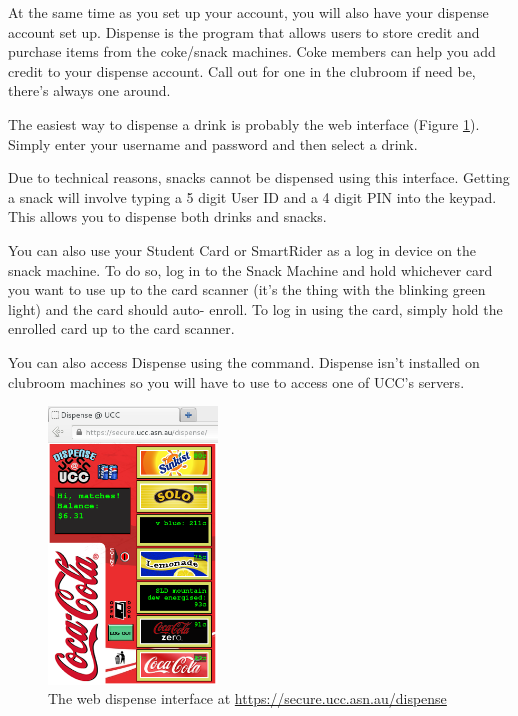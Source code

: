 

\begin{mdframed}

At the same time as you set up your account, you will also have your dispense account set up. Dispense is the program that allows users to store credit and purchase items from the coke/snack machines. Coke members can help you add credit to your dispense account. Call out for one in the clubroom if need be, there's always one around.


The easiest way to dispense a drink is probably the web interface (Figure \ref{webdispense.png}). Simply enter your username and password and then select a drink. 

Due to technical reasons, snacks cannot be dispensed using this interface. Getting a snack will involve typing a 5 digit User ID and a 4 digit PIN into the keypad. This allows you to dispense both drinks and snacks.

You can also use your Student Card or SmartRider as a log in device on the snack machine. To do so, log in to the Snack Machine and hold whichever card you want to use up to the card scanner (it's the thing with the blinking green light) and the card should auto- enroll. To log in using the card, simply hold the enrolled card up to the card scanner.


You can also access Dispense using the  command. Dispense isn't installed on clubroom machines so you will have to use  to access one of UCC's servers.


\begin{figure}[H]
	\centering
	\includegraphics[width=0.4\textwidth]{figures/webdispense.png}
	\caption{The web dispense interface at \url{https://secure.ucc.asn.au/dispense}} 
	\label{webdispense.png}
\end{figure}


\end{mdframed}
